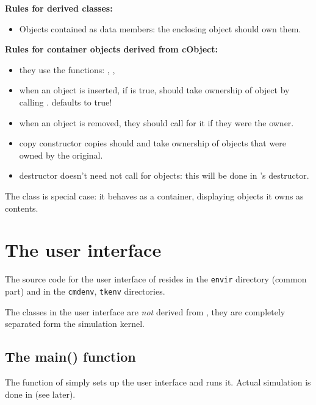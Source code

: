\textbf{Rules for derived classes:}
\begin{itemize}
  \item{Objects contained as data members: the enclosing object should
    own them.}
\end{itemize}

\textbf{Rules for container objects derived from cObject:}
\begin{itemize}
  \item{they use the functions: ,
    , }
  \item{when an object is inserted, if  is
    true, should take ownership of object by calling
    .  defaults to
    true!}
  \item{when an object is removed, they should call
     for it if they were the owner.}
  \item{copy constructor copies should  and take
    ownership of objects that were owned by the original.}
  \item{destructor doesn't need not call  for objects:
    this will be done in 's destructor.}
\end{itemize}

The class  is special case: it behaves as a container,
displaying objects it owns as contents.




\section{The user interface}

The source code for the user interface of {\opp} resides in the
\texttt{envir} directory (common part) and in the \texttt{cmdenv},
\texttt{tkenv} directories.

The classes in the user interface are \textit{not} derived from ,
they are completely separated form the simulation kernel.





\subsection{The main() function}

The  function of {\opp} simply sets up the user
interface and runs it. Actual simulation is done in
 (see later).





